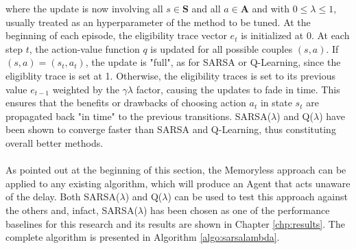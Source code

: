                 where the update is now involving all $s \in \mathbf{S}$ and all $a \in \mathbf{A}$ and with $ 0 \leq \lambda \leq 1$, usually treated as an hyperparameter of the method to be tuned. At the beginning of each episode, the eligibility trace vector $e_t$ is initialized at 0. At each step $t$, the action-value function $q$ is updated for all possible couples $(s, a)$. If $(s, a) = (s_t, a_t)$, the update is "full", as for SARSA or Q-Learning, since the eligiblity trace is set at 1. Otherwise, the eligibility traces is set to its previous value $e_{t-1}$ weighted by the $\gamma \lambda$ factor, causing the updates to fade in time. This ensures that the benefits or drawbacks of choosing action $a_t$ in state $s_t$ are propagated back "in time" to the previous transitions. SARSA($\lambda$) and Q($\lambda$) have been shown to converge faster than SARSA and Q-Learning, thus constituting overall better methods.
                \\\\
                As pointed out at the beginning of this section, the Memoryless approach can be applied to any existing algorithm, which will produce an Agent that acts unaware of the delay. Both SARSA($\lambda$) and Q($\lambda$) can be used to test this approach against the others and, infact, SARSA($\lambda$) has been chosen as one of the performance baselines for this research and its results are shown in Chapter \ref{chp:results}. The complete algorithm is presented in Algorithm \ref{algo:sarsalambda}.
                
